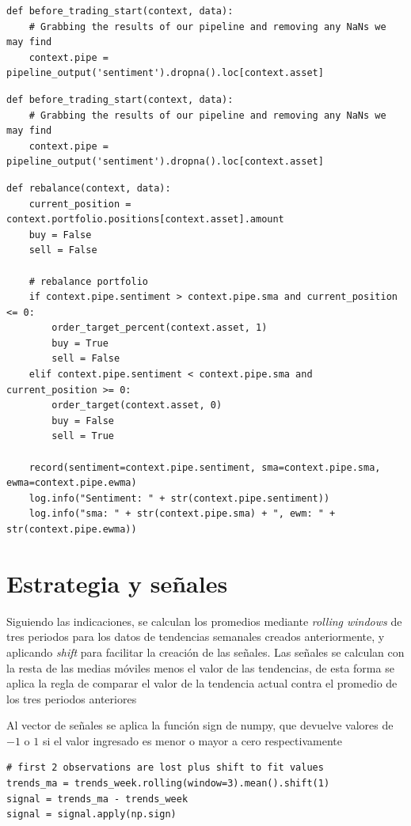 \documentclass[a4paper, 11pt, twocolumn]{article}
\begin{document}
\begin{lstlisting}
def before_trading_start(context, data):
    # Grabbing the results of our pipeline and removing any NaNs we may find
    context.pipe = pipeline_output('sentiment').dropna().loc[context.asset]
\end{lstlisting}

\begin{lstlisting}
def before_trading_start(context, data):
    # Grabbing the results of our pipeline and removing any NaNs we may find
    context.pipe = pipeline_output('sentiment').dropna().loc[context.asset]
\end{lstlisting}

\begin{lstlisting}
def rebalance(context, data):
    current_position = context.portfolio.positions[context.asset].amount
    buy = False
    sell = False
        
    # rebalance portfolio
    if context.pipe.sentiment > context.pipe.sma and current_position <= 0:
        order_target_percent(context.asset, 1)
        buy = True
        sell = False
    elif context.pipe.sentiment < context.pipe.sma and current_position >= 0:
        order_target(context.asset, 0)
        buy = False
        sell = True
        
    record(sentiment=context.pipe.sentiment, sma=context.pipe.sma, ewma=context.pipe.ewma)
    log.info("Sentiment: " + str(context.pipe.sentiment))
    log.info("sma: " + str(context.pipe.sma) + ", ewm: " + str(context.pipe.ewma))
\end{lstlisting}


\section{Estrategia y señales}
Siguiendo las indicaciones, se calculan los promedios mediante \textit{rolling windows} de tres periodos para los datos de tendencias semanales creados anteriormente, y aplicando \textit{shift} para facilitar la creación de las señales.
Las señales se calculan con la resta de las medias móviles menos el valor de las tendencias, de esta forma se aplica la regla de comparar el valor de la tendencia actual contra el promedio de los tres periodos anteriores

Al vector de señales se aplica la función sign de numpy, que devuelve valores de $-1$ o $1$ si el valor ingresado es menor o mayor a cero respectivamente
\begin{lstlisting}
# first 2 observations are lost plus shift to fit values
trends_ma = trends_week.rolling(window=3).mean().shift(1)
signal = trends_ma - trends_week
signal = signal.apply(np.sign)
\end{lstlisting}
\end{document}

